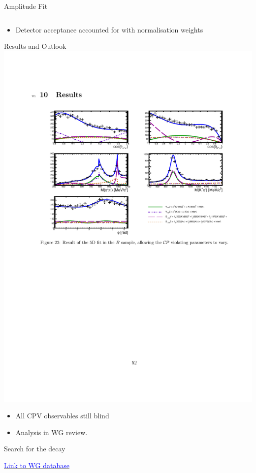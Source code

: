 \documentclass{beamer}
\def\LbpkEtapr {\decay{\Lb}{\proton\kaon\etapr}\xspace}
\begin{document}
\begin{frame}{Amplitude Fit}
\begin{columns}
\begin{column}{0.69\textwidth}
    \end{column}
  \end{columns}
  \begin{itemize}
  \item Detector acceptance accounted for with normalisation weights
  \end{itemize}
\end{frame}

\begin{frame}{Results and Outlook}
  \includegraphics[width=.75\textwidth]{FiveBodyFitResults.pdf}
  \begin{itemize}
  \item All CPV observables still blind
  \item Analysis in WG review.
  \end{itemize}
\end{frame}

\begin{frame}
  \begin{block}{}
    \centering \Huge Search for the decay  \LbpkEtapr
  \end{block}
  \centering \href{https://lhcb-wg.web.cern.ch/lhcb-WG/bnoc/listentry.py?name=2011\%2B12+Lb+-\%3E+p+K+eta\%28\%27\%29+BFs\&cat=analysis}{\textcolor{blue}{Link to WG database}}
\end{frame}
\end{document}
